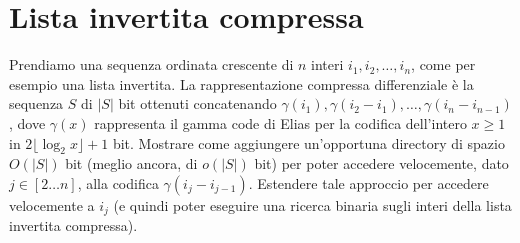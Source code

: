 \chapter{Lista invertita compressa}

\begin{problem*}
  Prendiamo una sequenza ordinata crescente di \(n\) interi
  \(i_1, i_2,\dots ,i_n\), come per esempio una lista invertita.
  La rappresentazione compressa differenziale \`e la sequenza \(S\) di
  \(|S|\) bit ottenuti concatenando
  \(\gamma(i_1),\gamma(i_2 - i_1),\dots ,\gamma(i_{n} - i_{n-1})\), dove
  \(\gamma(x)\) rappresenta il gamma code di Elias per la codifica
  dell'intero \(x\ge 1\) in \(2\lfloor\log_{2}{x}\rfloor + 1\) bit.
  Mostrare come aggiungere un'opportuna directory di spazio \(O(|S|)\) bit
  (meglio ancora, di \(o(|S|)\) bit) per poter accedere velocemente, dato
  \(j\in [2\dots n]\), alla codifica \(\gamma(i_{j} - i_{j-1})\).
  Estendere tale approccio per accedere velocemente a \(i_j\) (e quindi
  poter eseguire una ricerca binaria sugli interi della lista invertita
  compressa).
\end{problem*}

